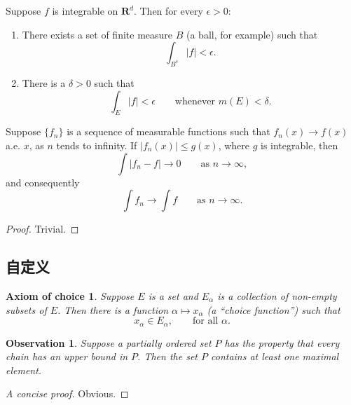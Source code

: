 \begin{proposition}
  Suppose $f$ is integrable on $\mathbf{R}^d$. Then for every $\epsilon > 0$:
  \begin{enumerate}
    \renewcommand{\theenumi}{\roman{enumi}}
    \item There exists a set of finite measure $B$ (a ball, for example) such that
    \begin{equation}
    \int_{B^c} |f| < \epsilon.
    \end{equation}
    \item There is a $\delta > 0$ such that
    \begin{equation}
    \int_E |f| < \epsilon \qquad \text{whenever } m(E) < \delta.
    \end{equation}
  \end{enumerate}
\end{proposition}

\begin{theorem}
  Suppose $\{f_n\}$ is a sequence of measurable functions such that
  $f_n(x) \to f(x)$ a.e. $x$, as $n$ tends to infinity.
  If $|f_n(x)| \leq g(x)$, where $g$ is integrable, then
  \begin{equation}
  \int |f_n - f| \to 0 \qquad \text{as } n \to \infty,
  \end{equation}
  and consequently
  \begin{equation}
  \int f_n \to \int f \qquad \text{as } n \to \infty.
  \end{equation}
\end{theorem}

\begin{proof}
  Trivial.
\end{proof}


\subsection{自定义}

\newtheorem*{axiomofchoice}{Axiom of choice}
\begin{axiomofchoice}
  Suppose $E$ is a set and ${E_\alpha}$ is a collection of
  non-empty subsets of $E$. Then there is a function $\alpha
  \mapsto x_\alpha$ (a ``choice function'') such that
  \begin{equation}
  x_\alpha \in E_\alpha,\qquad \text{for all }\alpha.
  \end{equation}
\end{axiomofchoice}

\newtheorem{observation}{Observation}[chapter]
\begin{observation}
  Suppose a partially ordered set $P$ has the property
  that every chain has an upper bound in $P$. Then the
  set $P$ contains at least one maximal element.
\end{observation}
\begin{proof}[A concise proof]
  Obvious.
\end{proof}

